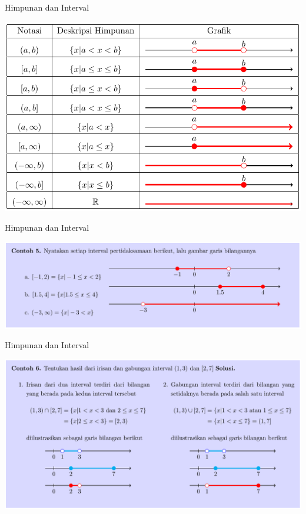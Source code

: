 \documentclass[pdflatex,compress,mathserif]{beamer}
\begin{document}
\begin{frame}{Himpunan dan Interval}
	\begin{center}
		\includegraphics[width=0.9\linewidth]{img/img16}
	\end{center}
\end{frame}

\begin{frame}{Himpunan dan Interval}
	\begin{center}
		\includegraphics[width=\linewidth]{img/img17}
	\end{center}
\end{frame}

\begin{frame}{Himpunan dan Interval}
	\begin{center}
		\includegraphics[width=\linewidth]{img/img18}
	\end{center}
\end{frame}
\end{document}
